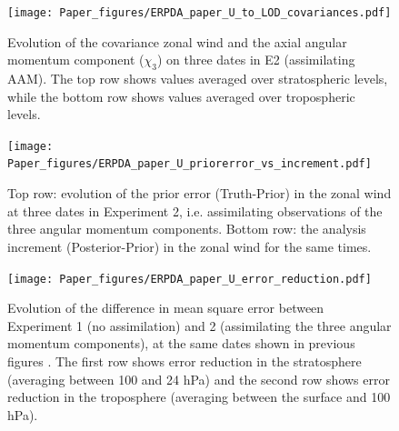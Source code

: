  \begin{figure}
	 \texttt{[image: Paper\_figures/ERPDA\_paper\_U\_to\_LOD\_covariances.pdf]}
	 \caption{Evolution of the covariance zonal wind and the axial angular momentum component ($\chi_3$) on three dates in E2 (assimilating AAM). The top row shows values averaged over stratospheric levels, while the bottom row shows values averaged over tropospheric levels.}
 \label{fig:covariances}
\end{figure}

 \begin{figure}
	 \texttt{[image: Paper\_figures/ERPDA\_paper\_U\_priorerror\_vs\_increment.pdf]}
	 \caption{Top row: evolution of the prior error (Truth-Prior) in the zonal wind at three dates in Experiment 2, i.e. assimilating observations of the three angular momentum components. Bottom row: the analysis increment (Posterior-Prior) in the zonal wind for the same times.} 
 \label{fig:error_increments}
\end{figure}

 \begin{figure}
	 \texttt{[image: Paper\_figures/ERPDA\_paper\_U\_error\_reduction.pdf]}
	 \caption{Evolution of the difference in mean square error between Experiment 1 (no assimilation) and 2 (assimilating the three angular momentum components), at the same dates shown in previous figures . The first row shows error reduction in the stratosphere (averaging between 100 and 24 hPa) and the second row shows error reduction in the troposphere (averaging between the surface and 100 hPa).}
	 \label{fig:ER}
\end{figure}

